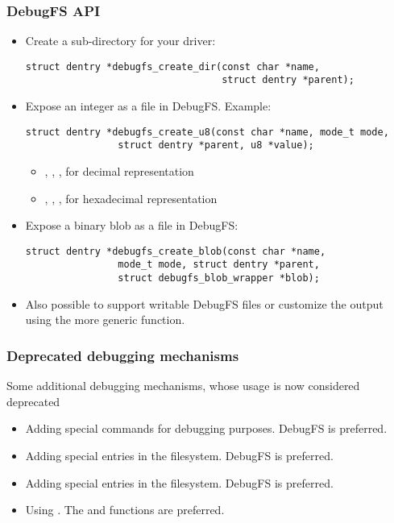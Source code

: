 \begin{frame}[fragile]
  \frametitle{DebugFS API}
  \begin{itemize}
  \item Create a sub-directory for your driver:
    \begin{verbatim}
struct dentry *debugfs_create_dir(const char *name,
                                  struct dentry *parent);
    \end{verbatim}
  \item Expose an integer as a file in DebugFS. Example:
    \begin{verbatim}
struct dentry *debugfs_create_u8(const char *name, mode_t mode,
                struct dentry *parent, u8 *value);
    \end{verbatim}
    \begin{itemize}
    \item {}, , ,  for decimal representation
    \item {}, , ,  for hexadecimal representation
    \end{itemize}
  \item Expose a binary blob as a file in DebugFS:
    \begin{verbatim}
struct dentry *debugfs_create_blob(const char *name,
                mode_t mode, struct dentry *parent,
                struct debugfs_blob_wrapper *blob);
    \end{verbatim}

  \item Also possible to support writable DebugFS files or customize
    the output using the more generic 
    function.
  \end{itemize}
\end{frame}

\begin{frame}
  \frametitle{Deprecated debugging mechanisms}
  Some additional debugging mechanisms, whose usage is now
  considered deprecated
  \begin{itemize}
  \item Adding special  commands for debugging
    purposes. DebugFS is preferred.
  \item Adding special entries in the  filesystem. DebugFS is
    preferred.
  \item Adding special entries in the  filesystem. DebugFS is
    preferred.
  \item Using . The  and 
    functions are preferred.
  \end{itemize}
\end{frame}

